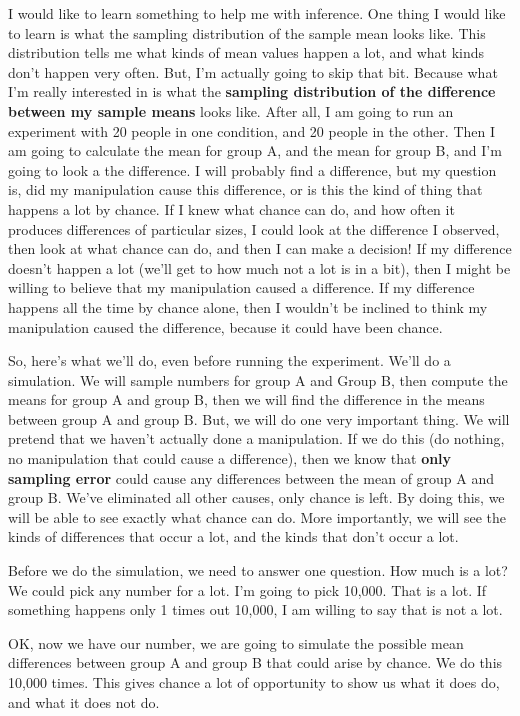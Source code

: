 \documentclass[
  letterpaper,
  DIV=11,
  numbers=noendperiod]{scrreprt}
\begin{document}
I would like to learn something to help me with inference. One thing I
would like to learn is what the sampling distribution of the sample mean
looks like. This distribution tells me what kinds of mean values happen
a lot, and what kinds don't happen very often. But, I'm actually going
to skip that bit. Because what I'm really interested in is what the
\textbf{sampling distribution of the difference between my sample means}
looks like. After all, I am going to run an experiment with 20 people in
one condition, and 20 people in the other. Then I am going to calculate
the mean for group A, and the mean for group B, and I'm going to look a
the difference. I will probably find a difference, but my question is,
did my manipulation cause this difference, or is this the kind of thing
that happens a lot by chance. If I knew what chance can do, and how
often it produces differences of particular sizes, I could look at the
difference I observed, then look at what chance can do, and then I can
make a decision! If my difference doesn't happen a lot (we'll get to how
much not a lot is in a bit), then I might be willing to believe that my
manipulation caused a difference. If my difference happens all the time
by chance alone, then I wouldn't be inclined to think my manipulation
caused the difference, because it could have been chance.

So, here's what we'll do, even before running the experiment. We'll do a
simulation. We will sample numbers for group A and Group B, then compute
the means for group A and group B, then we will find the difference in
the means between group A and group B. But, we will do one very
important thing. We will pretend that we haven't actually done a
manipulation. If we do this (do nothing, no manipulation that could
cause a difference), then we know that \textbf{only sampling error}
could cause any differences between the mean of group A and group B.
We've eliminated all other causes, only chance is left. By doing this,
we will be able to see exactly what chance can do. More importantly, we
will see the kinds of differences that occur a lot, and the kinds that
don't occur a lot.

Before we do the simulation, we need to answer one question. How much is
a lot? We could pick any number for a lot. I'm going to pick 10,000.
That is a lot. If something happens only 1 times out 10,000, I am
willing to say that is not a lot.

OK, now we have our number, we are going to simulate the possible mean
differences between group A and group B that could arise by chance. We
do this 10,000 times. This gives chance a lot of opportunity to show us
what it does do, and what it does not do.
\end{document}
